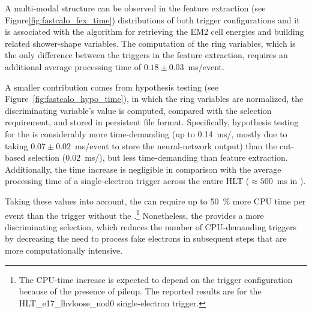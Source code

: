 A multi-modal structure can be observed in the feature extraction (see Figure\ref{fig:fastcalo_fex_time}) distributions of both trigger configurations and it is associated with the algorithm for retrieving the EM2 cell energies and building related shower-shape variables. The computation of the ring variables, which is the only difference between the triggers in the \fastcalo feature extraction, requires an additional average processing time of $0.18 \pm 0.03$~ms/event. 


A smaller contribution comes from hypothesis testing (see Figure~\ref{fig:fastcalo_hypo_time}), in which the ring variables are normalized, the discriminating variable's value is computed, compared with the selection requirement, and stored in persistent file format. Specifically, hypothesis testing for the \rnn{} is considerably more time-demanding (up to \SI{0.14}{\ms/}, mostly due to taking  
$0.07 \pm 0.02$~ms/event to store the neural-network output) than the cut-based selection (\SI{0.02}{\ms/}), but less time-demanding than  feature extraction. Additionally, the time increase is negligible in comparison with the average processing time of a single-electron trigger across the entire HLT ($\approx 500$~ms in \RunTwo).

Taking these values into account, the \rnn{} can require up to \SI{50}{\%} more \fastcalo{} CPU time per event
than the trigger without the \rnn{}.\footnote{The CPU-time increase is expected to depend on the trigger configuration because of the presence of pileup. The reported results are for the HLT\_e17\_lhvloose\_nod0 single-electron trigger.} Nonetheless, the \rnn{} provides a more discriminating selection, which reduces the number of CPU-demanding triggers by decreasing the need to process fake electrons in subsequent steps that are more computationally intensive. 





